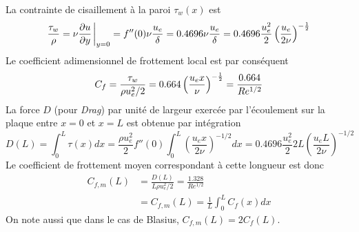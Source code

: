    La contrainte de cisaillement à la paroi $\tau_w(x)$ est
    \begin{equation}
      \frac{\tau_w}{\rho} = \nu \pdv{u}{y}\eval_{y=0} = f''(0) \nu \frac{u_e}{\delta} = 0.4696\nu\frac{u_e}{\delta} = 0.4696\frac{u_e^2}{2} \left(\frac{u_e}{2\nu}\right)^{-\recip{2}}
    \end{equation}
    Le coefficient adimensionnel de frottement local est par conséquent
    \begin{equation}\label{eq:frottement}
      C_f = \frac{\tau_w}{\rho u_e^2 /2} = 0.664 \left(\frac{u_e x}{\nu}\right)^{-\frac{1}{2}} = \frac{0.664}{Re^{1/2}}
    \end{equation}
    La force $D$ (pour \textit{Drag}) par unité de largeur exercée par l'écoulement sur la plaque entre $x=0$ et $x=L$ est obtenue par intégration
    \begin{equation}
      D(L) = \int_0^L \tau(x) dx = \frac{\rho u_e^2}{2} f''(0) \int_0^L \left(\frac{u_e x}{2\nu}\right)^{-1/2} dx = 0.4696 \frac{u_e^2}{2} 2 L \left(\frac{u_e L}{2\nu}\right)^{-1/2}
    \end{equation}
    Le coefficient de frottement moyen correspondant à cette longueur est donc
    \begin{equation}
      \begin{aligned}
        C_{f,m}(L) &= \frac{D(L)}{L \rho u_e^2/2} = \frac{1.328}{Re^{1/2}}\\
        &= C_{f,m}(L) = \frac{1}{L} \int_0^L C_f(x) dx
      \end{aligned}
    \end{equation}
    On note aussi que dans le cas de Blasius, $C_{f,m}(L) = 2C_f(L)$.

